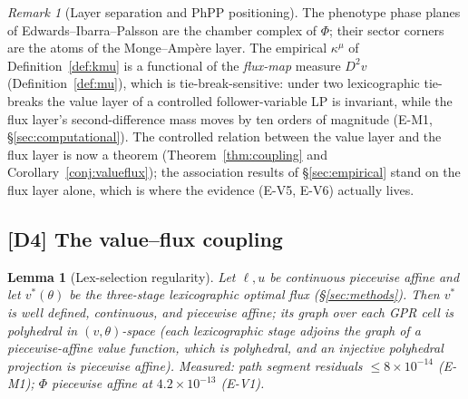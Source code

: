 \documentclass[11pt,a4paper]{article}
\theoremstyle{plain}
\newtheorem{lemma}[theorem]{Lemma}
\theoremstyle{definition}
\theoremstyle{remark}
\newtheorem{remark}[theorem]{Remark}
\newcommand{\kmu}{\kappa^{\mu}}
\begin{document}
\begin{remark}[Layer separation and PhPP positioning]\label{rem:layersep}
The phenotype phase planes of Edwards--Ibarra--Palsson
\citep{edwards2001, ibarra2002} are the chamber
complex of $\Phi$; their sector corners are the atoms of the
Monge--Amp\`ere layer. The empirical $\kmu$ of
Definition~\ref{def:kmu} is a functional of the \emph{flux-map} measure
$D^2 v$ (Definition~\ref{def:mu}), which is tie-break-sensitive: under
two lexicographic tie-breaks the value layer of a controlled
follower-variable LP is invariant, while the flux layer's
second-difference mass moves by ten orders of magnitude (E-M1,
\S\ref{sec:computational}). The
controlled relation between the value layer and the flux layer is now
a theorem (Theorem~\ref{thm:coupling} and
Corollary~\ref{conj:valueflux}); the association results of
\S\ref{sec:empirical} stand on the flux layer alone, which is where
the evidence (E-V5, E-V6) actually lives.
\end{remark}

\subsection{[D4] The value--flux coupling}

\begin{lemma}[Lex-selection regularity]\label{lem:lex}
Let $\ell, u$ be continuous piecewise affine and let $v^*(\theta)$ be
the three-stage lexicographic optimal flux (\S\ref{sec:methods}).
Then $v^*$ is well defined, continuous, and piecewise affine; its
graph over each GPR cell is polyhedral in $(v,\theta)$-space (each
lexicographic stage adjoins the graph of a piecewise-affine value
function, which is polyhedral, and an injective polyhedral projection
is piecewise affine). Measured: path segment residuals $\le 8 \times
10^{-14}$ (E-M1); $\Phi$ piecewise affine at $4.2 \times 10^{-13}$
(E-V1).
\end{lemma}
\end{document}
